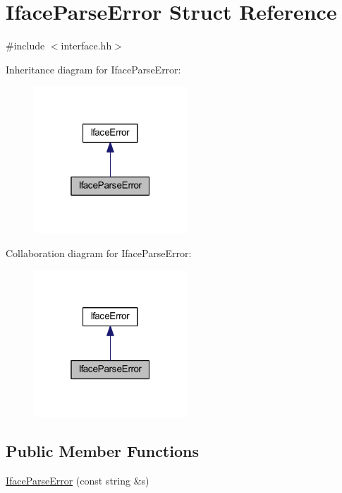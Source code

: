 \hypertarget{struct_iface_parse_error}{}\section{Iface\+Parse\+Error Struct Reference}
\label{struct_iface_parse_error}


{\ttfamily \#include $<$interface.\+hh$>$}



Inheritance diagram for Iface\+Parse\+Error\+:
\nopagebreak
\begin{figure}[H]
\begin{center}
\leavevmode
\includegraphics[width=163pt]{struct_iface_parse_error__inherit__graph}
\end{center}
\end{figure}


Collaboration diagram for Iface\+Parse\+Error\+:
\nopagebreak
\begin{figure}[H]
\begin{center}
\leavevmode
\includegraphics[width=163pt]{struct_iface_parse_error__coll__graph}
\end{center}
\end{figure}
\subsection*{Public Member Functions}
\begin{DoxyCompactItemize}
\item 
\mbox{\hyperlink{struct_iface_parse_error_aceba1718d48f681465461f11e7108d75}{Iface\+Parse\+Error}} (const string \&s)
\end{DoxyCompactItemize}
